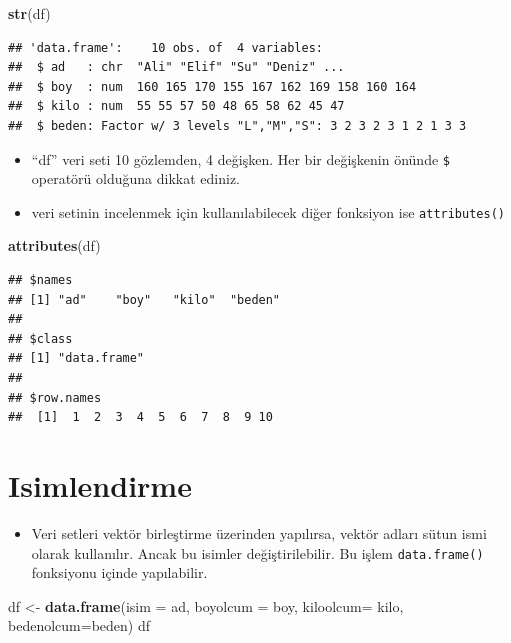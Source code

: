 \documentclass[
  oneside]{book}
\newenvironment{Shaded}{\begin{snugshade}}{\end{snugshade}}
\newcommand{\AttributeTok}[1]{\textcolor[rgb]{0.13,0.29,0.53}{#1}}
\newcommand{\FunctionTok}[1]{\textcolor[rgb]{0.13,0.29,0.53}{\textbf{#1}}}
\newcommand{\NormalTok}[1]{#1}
\newcommand{\OtherTok}[1]{\textcolor[rgb]{0.56,0.35,0.01}{#1}}
\providecommand{\tightlist}{%
  \setlength{\itemsep}{0pt}\setlength{\parskip}{0pt}}
\begin{document}
\begin{Shaded}
\begin{Highlighting}[]
\FunctionTok{str}\NormalTok{(df)}
\end{Highlighting}
\end{Shaded}

\begin{verbatim}
## 'data.frame':    10 obs. of  4 variables:
##  $ ad   : chr  "Ali" "Elif" "Su" "Deniz" ...
##  $ boy  : num  160 165 170 155 167 162 169 158 160 164
##  $ kilo : num  55 55 57 50 48 65 58 62 45 47
##  $ beden: Factor w/ 3 levels "L","M","S": 3 2 3 2 3 1 2 1 3 3
\end{verbatim}

\begin{itemize}
\item
  ``df'' veri seti 10 gözlemden, 4 değişken. Her bir değişkenin önünde \texttt{\$} operatörü olduğuna dikkat ediniz.
\item
  veri setinin incelenmek için kullanılabilecek diğer fonksiyon ise \texttt{attributes()}
\end{itemize}

\begin{Shaded}
\begin{Highlighting}[]
\FunctionTok{attributes}\NormalTok{(df)}
\end{Highlighting}
\end{Shaded}

\begin{verbatim}
## $names
## [1] "ad"    "boy"   "kilo"  "beden"
## 
## $class
## [1] "data.frame"
## 
## $row.names
##  [1]  1  2  3  4  5  6  7  8  9 10
\end{verbatim}

\hypertarget{isimlendirme}{%
\section{Isimlendirme}\label{isimlendirme}}

\begin{itemize}
\tightlist
\item
  Veri setleri vektör birleştirme üzerinden yapılırsa, vektör adları sütun ismi olarak kullanılır. Ancak bu isimler değiştirilebilir. Bu işlem \texttt{data.frame()} fonksiyonu içinde yapılabilir.
\end{itemize}

\begin{Shaded}
\begin{Highlighting}[]
\NormalTok{df }\OtherTok{\textless{}{-}} \FunctionTok{data.frame}\NormalTok{(}\AttributeTok{isim =}\NormalTok{ ad,}
                 \AttributeTok{boyolcum =}\NormalTok{ boy,}
                 \AttributeTok{kiloolcum=}\NormalTok{ kilo, }
                 \AttributeTok{bedenolcum=}\NormalTok{beden)}
\NormalTok{df}
\end{Highlighting}
\end{Shaded}
\end{document}
